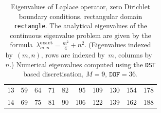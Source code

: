 \begin{table}
{{\begin{tabular}{r|rrrrrrrrr}
      13 & 59 & 64 & 71 & 82 & 95 & 109 & 130 & 154 & 178 \\
      14 & 69 & 75 & 81 & 90 & 106 & 122 & 139 & 162 & 188 \\
      \bottomrule
    \end{tabular}}
  }
  \caption{Eigenvalues of Laplace operator, zero Dirichlet boundary conditions, rectangular domain \texttt{rectangle}. The analytical eigenvalues of the continuous eigenvalue problem are given by the formula~$\lambda_{m,n}^{\mathtt{exact}} = \frac{m^2}{4} + n^2$. (Eigenvalues indexed by~$(m, n)$, rows are indexed by~$m$, columns by~$n$.) Numerical eigenvalues computed using the \texttt{DST} based discretisation, $M = 9$, $\mathtt{DOF} = 36$.}
  \label{tab:rectangle_indexing_M9}
\end{table}

